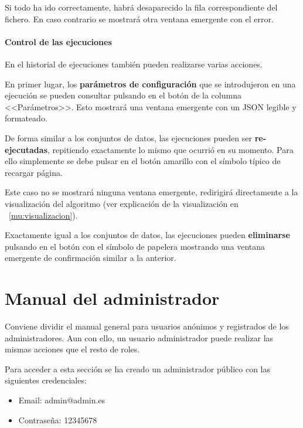 
Si todo ha ido correctamente, habrá desaparecido la fila correspondiente del
fichero. En caso contrario se mostrará otra ventana emergente con el error.

\paragraph{Control de las ejecuciones} En el historial de ejecuciones también
pueden realizarse varias acciones.

\label{mu:parametrosrun}
En primer lugar, los \textbf{parámetros de configuración} que se introdujeron en
una ejecución se pueden consultar pulsando en el botón de la columna
<<Parámetros>>. Esto mostrará una ventana emergente con un JSON legible y
formateado.


De forma similar a los conjuntos de datos, las ejecuciones pueden ser
\textbf{re-ejecutadas}, repitiendo exactamente lo mismo que ocurrió en su
momento. Para ello simplemente se debe pulsar en el botón amarillo con el
símbolo típico de recargar página.

Este caso no se mostrará ninguna ventana emergente, redirigirá directamente a la
visualización del algoritmo (ver explicación de la visualización en
~\ref{mu:visualizacion}).

\label{mu:eliminarrun}
Exactamente igual a los conjuntos de datos, las ejecuciones pueden
\textbf{eliminarse} pulsando en el botón con el símbolo de papelera mostrando
una ventana emergente de confirmación similar a la anterior.



\section{Manual del administrador}

Conviene dividir el manual general para usuarios anónimos y registrados de los
administradores. Aun con ello, un usuario administrador puede realizar las
mismas acciones que el resto de roles.

Para acceder a esta sección se ha creado un administrador público con las
siguientes credenciales:
\begin{itemize}
    \item Email: admin@admin.es
    \item Contraseña: 12345678
\end{itemize}

